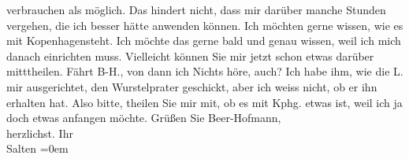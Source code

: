 \begin{ledgroupsized}[t]{13cm}
               verbrauchen als möglich. Das hindert nicht, dass mir darüber manche Stunden vergehen,
               die ich besser hätte anwenden können. \pend
           \pstart
           Ich möchten gerne wissen, wie es mit Kopenhagensteht. Ich möchte das gerne
               bald und genau wissen, weil ich mich danach einrichten muss. Vielleicht können Sie
               mir jetzt schon etwas darüber mitttheilen. Fährt B-H., von dann ich Nichts höre, auch? \pend
           \pstart
           Ich habe ihm,  wie die L. mir ausgerichtet, den Wurstelprater geschickt, aber ich weiss nicht, ob er {\pb}ihn erhalten hat. Also bitte,
               theilen Sie mir mit, ob es mit Kphg. etwas ist,
               weil ich ja doch etwas anfangen möchte. \pend
           \pstart
           Grüßen Sie Beer-Hofmann, {\\[\baselineskip]}herzlichst.
               Ihr {\\[\baselineskip]}\spacefill\mbox{Salten}\pend
           \leftskip=0em{}
         
         \endnumbering{}\end{ledgroupsized}\begin{anhang}\end{anhang}\newcommand{\dateiname}{L03158}\newcommand{\titel}{Felix Salten an Arthur Schnitzler, 16. 7. [1895]}\newcommand{\editorInnen}{Martin Anton Müller und Laura Untner}
      